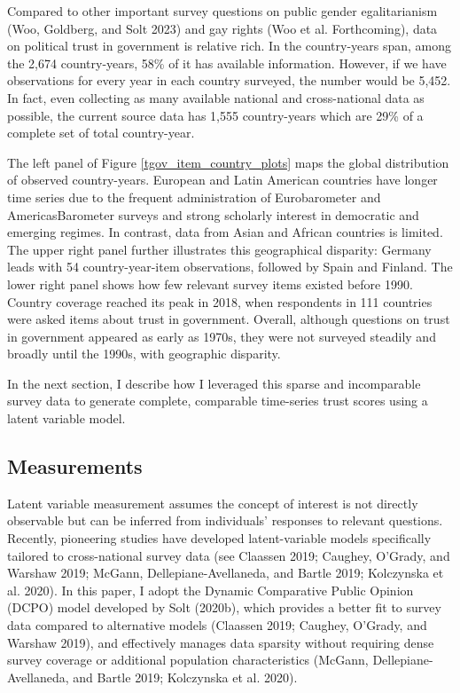 \documentclass[
  12pt,
]{article}
\begin{document}
Compared to other important survey questions on public gender egalitarianism (Woo, Goldberg, and Solt 2023) and gay rights (Woo et al. Forthcoming), data on political trust in government is relative rich.
In the country-years span, among the 2,674 country-years, 58\% of it has available information.
However, if we have observations for every year in each country surveyed, the number would be 5,452.
In fact, even collecting as many available national and cross-national data as possible, the current source data has 1,555 country-years which are 29\% of a complete set of total country-year.

The left panel of Figure \nobreakspace{}\ref{tgov_item_country_plots} maps the global distribution of observed country-years.
European and Latin American countries have longer time series due to the frequent administration of Eurobarometer and AmericasBarometer surveys and strong scholarly interest in democratic and emerging regimes.
In contrast, data from Asian and African countries is limited.
The upper right panel further illustrates this geographical disparity: Germany leads with 54 country-year-item observations, followed by Spain and Finland.
The lower right panel shows how few relevant survey items existed before 1990.
Country coverage reached its peak in 2018, when respondents in 111 countries were asked items about trust in government.
Overall, although questions on trust in government appeared as early as 1970s, they were not surveyed steadily and broadly until the 1990s, with geographic disparity.

In the next section, I describe how I leveraged this sparse and incomparable survey data to generate complete, comparable time-series trust scores using a latent variable model.

\subsection{Measurements}\label{measurements}

Latent variable measurement assumes the concept of interest is not directly observable but can be inferred from individuals' responses to relevant questions.
Recently, pioneering studies have developed latent-variable models specifically tailored to cross-national survey data (see Claassen 2019; Caughey, O'Grady, and Warshaw 2019; McGann, Dellepiane-Avellaneda, and Bartle 2019; Kolczynska et al. 2020).
In this paper, I adopt the Dynamic Comparative Public Opinion (DCPO) model developed by Solt (2020b), which provides a better fit to survey data compared to alternative models (Claassen 2019; Caughey, O'Grady, and Warshaw 2019), and effectively manages data sparsity without requiring dense survey coverage or additional population characteristics (McGann, Dellepiane-Avellaneda, and Bartle 2019; Kolczynska et al. 2020).
\end{document}

